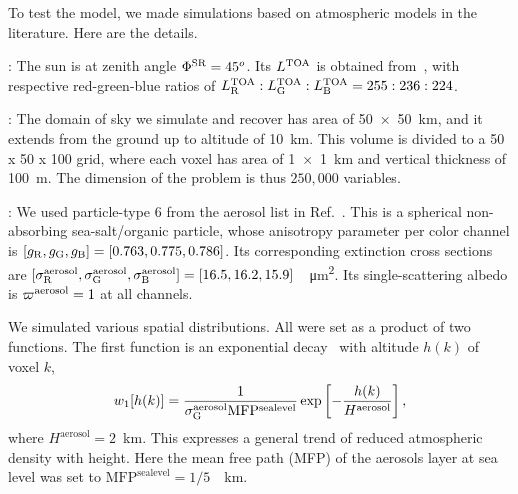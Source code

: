 \documentclass[10pt,letterpaper]{article}
\begin{document}
To test the model, we made simulations based on atmospheric models in
the literature. Here are the details.

: The sun is at zenith angle $\Phi^{\rm
  SR}=45^o$. Its $L^{\rm TOA}$ is obtained
from~\cite{BBradiance,sun_composition}, with respective red-green-blue
ratios of $L^{\rm TOA}_{\rm R}:L^{\rm TOA}_{\rm G}:L^{\rm TOA}_{\rm
  B}=255:236:224$.

: The domain of sky we simulate and recover
has area of \SI{50 x 50}{\km}, and it extends from the ground up to
altitude of \SI{10}{\km}. This volume is divided to a \num{50 x 50 x
  100} grid, where each voxel has area of \SI{1 x 1}{\km} and vertical
thickness of \SI{100}{\metre}. The dimension of the problem is thus
$250,000$ variables.

: We used particle-type 6 from the aerosol list
in Ref.~\cite{Martonchik2009}. This is a spherical non-absorbing
sea-salt/organic particle, whose anisotropy parameter per color
channel is $[g_{\rm R},g_{\rm G},g_{\rm B}]=[0.763,0.775,0.786]$. Its
corresponding extinction cross sections are $[\sigma^{\rm
  aerosol}_{\rm R}, \sigma^{\rm aerosol}_{\rm G}, \sigma^{\rm
  aerosol}_{\rm
  B}]=[16.5,16.2,15.9]$~\si[sticky-per]{\per\micro\meter\squared}.
Its single-scattering albedo is $\varpi^{\rm aerosol}=1$ at all
channels.

We simulated various spatial distributions. All were set as a product
of two functions. The first function is an exponential
decay~\cite{Levi1980} with altitude $h(k)$ of voxel $k$,
\begin{align}
  w_1[h(k)] = \frac{1} {\sigma^{\rm aerosol}_{\rm G} \mathrm{MFP^{sea
        level}}} \exp\left[-\frac{h(k)}{H^\mathrm{aerosol}}\right],
\end{align}
where $H^\mathrm{aerosol}=2$~\si{\km}. This expresses a general trend
of reduced atmospheric density with height. Here the mean free path
(MFP) of the aerosols layer at sea level was set to \linebreak
\mbox{$\mathrm{MFP^{sea level}}=1/5$~\si{\per\km}}.

\end{document}
